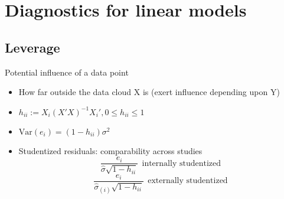 \documentclass[12pt]{article}\usepackage{graphicx, color}
\theoremstyle{definition}
\newcommand{\Var}{\mathrm{Var}}
\renewcommand{\hat}{\widehat}
\begin{document}
\section{Diagnostics for linear models}
\subsection{Leverage} 
Potential influence of a data point
\begin{itemize}
\item How far outside the data cloud X is (exert influence depending upon Y)
\item $h_{ii}:=X_i(X'X)^{-1}X_i', 0\leq h_{ii}\leq 1$
\item $\Var(e_i)=(1-h_{ii})\sigma^2$
\item Studentized residuals: comparability across studies
$$\frac{e_i}{\hat \sigma\sqrt{1-h_{ii}}}~~\text{internally studentized}$$
$$\frac{e_i}{\hat \sigma_{(i)}\sqrt{1-h_{ii}}}~~\text{externally studentized}$$
\end{itemize}
\end{document}
